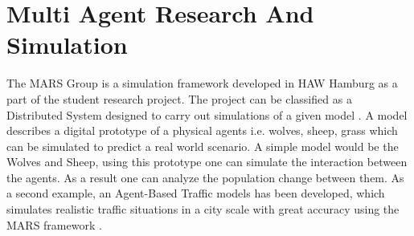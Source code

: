 
\section{Multi Agent Research And Simulation}
        \label{section:MARS}
        The MARS Group is a simulation framework developed 
        in HAW Hamburg as a  part of the student research project. The project can be classified as a
        Distributed System \cite{DistributedSystems} designed to carry out simulations of a given model 
        \cite{HAWHamburgMARS}. 
        A model describes a digital prototype of a physical agents i.e. wolves, sheep, grass 
        which can be simulated to predict a real world scenario. A simple model would
        be the Wolves and Sheep, using this prototype one can simulate the interaction between the agents. 
        As a result one can analyze the population change between them. As a second example, an Agent-Based Traffic
        models has been developed, which simulates realistic traffic situations in a city scale with great accuracy 
        using the MARS framework \cite{TrafficModel}.

        \par
